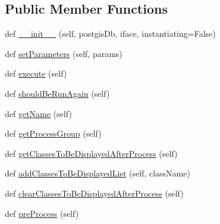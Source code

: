 \subsection*{Public Member Functions}
\begin{DoxyCompactItemize}
\item 
def \mbox{\hyperlink{class_dsg_tools_1_1_validation_tools_1_1_validation_processes_1_1validation_process_1_1_validation_process_a7cc4d0505a131f0e2730e74cab7d1eed}{\+\_\+\+\_\+init\+\_\+\+\_\+}} (self, postgis\+Db, iface, instantiating=False)
\item 
def \mbox{\hyperlink{class_dsg_tools_1_1_validation_tools_1_1_validation_processes_1_1validation_process_1_1_validation_process_af50a5bfb0819a8d2c7691550582c1c6a}{set\+Parameters}} (self, params)
\item 
def \mbox{\hyperlink{class_dsg_tools_1_1_validation_tools_1_1_validation_processes_1_1validation_process_1_1_validation_process_a00ff3f75068b419a9037f8e1284e4433}{execute}} (self)
\item 
def \mbox{\hyperlink{class_dsg_tools_1_1_validation_tools_1_1_validation_processes_1_1validation_process_1_1_validation_process_aa0354d706694271bcd6cdb1c3dc63f22}{should\+Be\+Run\+Again}} (self)
\item 
def \mbox{\hyperlink{class_dsg_tools_1_1_validation_tools_1_1_validation_processes_1_1validation_process_1_1_validation_process_a1d1df94ebe9093d378f200c33192cd6e}{get\+Name}} (self)
\item 
def \mbox{\hyperlink{class_dsg_tools_1_1_validation_tools_1_1_validation_processes_1_1validation_process_1_1_validation_process_a896bdb5ce96597a965a452e5c5b71527}{get\+Process\+Group}} (self)
\item 
def \mbox{\hyperlink{class_dsg_tools_1_1_validation_tools_1_1_validation_processes_1_1validation_process_1_1_validation_process_a53accf4bb6dda515311eb07a5b5bb7b8}{get\+Classes\+To\+Be\+Displayed\+After\+Process}} (self)
\item 
def \mbox{\hyperlink{class_dsg_tools_1_1_validation_tools_1_1_validation_processes_1_1validation_process_1_1_validation_process_a8fea1371f192ee3c0489f17e957d511b}{add\+Classes\+To\+Be\+Displayed\+List}} (self, class\+Name)
\item 
def \mbox{\hyperlink{class_dsg_tools_1_1_validation_tools_1_1_validation_processes_1_1validation_process_1_1_validation_process_a201bf53f735c786285f1745bac4195bd}{clear\+Classes\+To\+Be\+Displayed\+After\+Process}} (self)
\item 
def \mbox{\hyperlink{class_dsg_tools_1_1_validation_tools_1_1_validation_processes_1_1validation_process_1_1_validation_process_a1484ed4b2c2f8c17cdfee7c6285abff4}{pre\+Process}} (self)

\end{DoxyCompactItemize}
